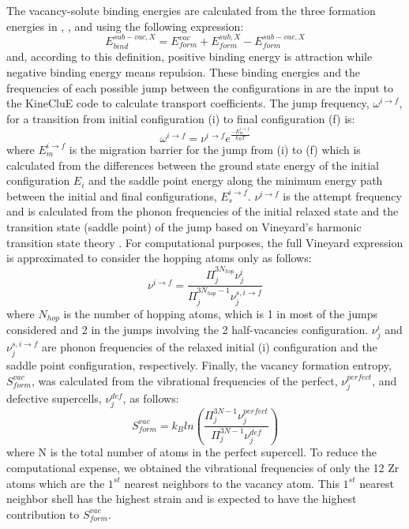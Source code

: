 \documentclass[preprint,12pt]{elsarticle}
\begin{document}
The vacancy-solute binding energies are calculated from the three formation energies in , , and  using the following expression:
\begin{equation}
\label{eq_Eb}
    E_{bind}^{sub-vac,X} = E_{form}^{vac} + E_{form}^{sub,X} - E_{form}^{sub-vac,X}
\end{equation}
and, according to this definition, positive binding energy is attraction while negative binding energy means repulsion. These binding energies and the frequencies of each possible jump between the configurations in  are the input to the KineCluE code to calculate transport coefficients. The jump frequency, $\omega^{i\rightarrow f}$, for a transition from initial configuration (i) to final configuration (f) is: \begin{equation}
    \omega^{i\rightarrow f} = \nu^{i\rightarrow f} e^{\frac{-E_m^{i\rightarrow f}}{k_B T}}
\end{equation}
where $E_m^{i\rightarrow f}$ is the migration barrier for the jump from (i) to (f) which is calculated from the differences between the ground state energy of the initial configuration $E_i$ and the saddle point energy along the minimum energy path between the initial and final configurations, $E_s^{i\rightarrow f}$. $\nu^{i\rightarrow f}$ is the attempt frequency and is calculated from the phonon frequencies of the initial relaxed state and the transition state (saddle point) of the jump based on Vineyard's harmonic transition state theory \cite{vineyard_frequency_1957}. For computational purposes, the full Vineyard expression is approximated to consider the hopping atoms only as follows:
\begin{equation}
    \nu^{i\rightarrow f} = \frac{\Pi^{3N_{hop}}_j  \nu^{i}_j}{\Pi^{3N_{hop}-1}_j  \nu^{s,i\rightarrow f}_j}
\end{equation}
where $N_{hop}$ is the number of hopping atoms, which is 1 in most of the jumps considered and 2 in the jumps involving the 2 half-vacancies configuration. $\nu^{i}_j$ and $\nu^{s,i\rightarrow f}_j$ are phonon frequencies of the relaxed initial (i) configuration and the saddle point configuration, respectively. Finally, the vacancy formation entropy, $S_{form}^{vac}$, was calculated from the vibrational frequencies of the perfect, $\nu_j^{perfect}$, and defective supercells, $\nu_j^{def}$, as follows:
\begin{equation}
    S_{form}^{vac} = k_B ln(\frac{\Pi^{3N-1}_j \nu_j^{perfect}}{\Pi^{3N-1}_j \nu_j^{def}})
\end{equation}
where N is the total number of atoms in the perfect supercell. To reduce the computational expense, we obtained the vibrational frequencies of only the 12 Zr atoms which are the $1^{st}$ nearest neighbors to the vacancy atom. This $1^{st}$ nearest neighbor shell has the highest strain and is expected to have the highest contribution to $S_{form}^{vac}$.
\end{document}
